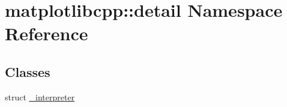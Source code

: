 \hypertarget{namespacematplotlibcpp_1_1detail}{}\section{matplotlibcpp\+::detail Namespace Reference}
\label{namespacematplotlibcpp_1_1detail}
\subsection*{Classes}
\begin{DoxyCompactItemize}
\item 
struct \mbox{\hyperlink{structmatplotlibcpp_1_1detail_1_1__interpreter}{\+\_\+interpreter}}
\end{DoxyCompactItemize}
